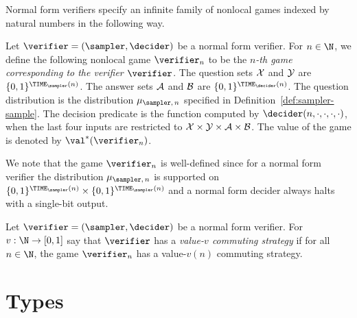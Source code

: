 Normal form verifiers specify an infinite family of nonlocal games indexed by
natural numbers in the following way.

\begin{definition}
  \label{def:normal-game}
  Let $\verifier = (\sampler, \decider)$ be a normal form verifier.
  For $n \in \N$, we define the following nonlocal game $\verifier_{n}$ to be
  the \emph{$n$-th game corresponding to the verifier $\verifier$}.
  The question sets $\cal{X}$ and $\cal{Y}$ are $\{0,1\}^{\TIME_\sampler(n)}$.
  The answer sets $\cal{A}$ and $\cal{B}$ are $\{0,1\}^{\TIME_\decider(n)}$.
  The question distribution is the distribution $\mu_{\sampler,\, n}$ specified
  in Definition~\ref{def:sampler-sample}.
  The decision predicate is the function computed by
  $\decider(n,\cdot,\cdot,\cdot,\cdot)$, when the last four inputs are
  restricted to $\cal{X}\times \cal{Y}\times\cal{A}\times\cal{B}$.
  The value of the game is denoted by $\val^*(\verifier_{n})$.
\end{definition}

We note that the game $\verifier_n$ is well-defined since for a normal form
verifier the distribution $\mu_{\sampler,\, n}$ is supported on
$\{0,1\}^{\TIME_\sampler(n)}\times \{0,1\}^{\TIME_\sampler(n)}$ and a normal
form decider always halts with a single-bit output.

\begin{definition}
  \label{def:comm-with-checker}
  Let $\verifier = (\sampler, \decider)$ be a normal form verifier.
  For $v:\N\to [0,1]$ say that $\verifier$ has a \emph{value-$v$ commuting
    strategy} if for all $n \in \N$, the game $\verifier_n$ has a value-$v(n)$
  commuting strategy.
\end{definition}


 
\section{Types}
